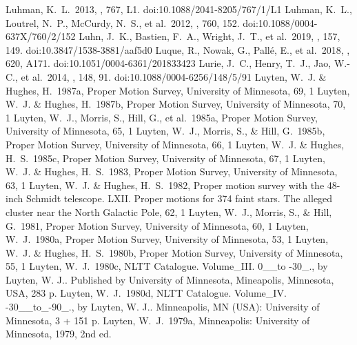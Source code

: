 \documentclass[twocolumn,tighten,twocolappendix]{aastex631}
\begin{document}
\begin{thebibliography}{}
 Luhman, K.~L.\ 2013, \apjl, 767, L1. doi:10.1088/2041-8205/767/1/L1
 Luhman, K.~L., Loutrel, N.~P., McCurdy, N.~S., et al.\ 2012, \apj, 760, 152. doi:10.1088/0004-637X/760/2/152
 Luhn, J.~K., Bastien, F.~A., Wright, J.~T., et al.\ 2019, \aj, 157, 149. doi:10.3847/1538-3881/aaf5d0
 Luque, R., Nowak, G., Pall{\'e}, E., et al.\ 2018, \aap, 620, A171. doi:10.1051/0004-6361/201833423
 Lurie, J.~C., Henry, T.~J., Jao, W.-C., et al.\ 2014, \aj, 148, 91. doi:10.1088/0004-6256/148/5/91
 Luyten, W.~J. \& Hughes, H.\ 1987a, Proper Motion Survey, University of Minnesota, 69, 1
 Luyten, W.~J. \& Hughes, H.\ 1987b, Proper Motion Survey, University of Minnesota, 70, 1
 Luyten, W.~J., Morris, S., Hill, G., et al.\ 1985a, Proper Motion Survey, University of Minnesota, 65, 1
 Luyten, W.~J., Morris, S., \& Hill, G.\ 1985b, Proper Motion Survey, University of Minnesota, 66, 1
 Luyten, W.~J. \& Hughes, H.~S.\ 1985c, Proper Motion Survey, University of Minnesota, 67, 1
 Luyten, W.~J. \& Hughes, H.~S.\ 1983, Proper Motion Survey, University of Minnesota, 63, 1
 Luyten, W.~J. \& Hughes, H.~S.\ 1982, Proper motion survey with the 48-inch Schmidt telescope. LXII. Proper motions for 374 faint stars. The alleged cluster near the North Galactic Pole, 62, 1
 Luyten, W.~J., Morris, S., \& Hill, G.\ 1981, Proper Motion Survey, University of Minnesota, 60, 1
 Luyten, W.~J.\ 1980a, Proper Motion Survey, University of Minnesota, 53, 1
 Luyten, W.~J. \& Hughes, H.~S.\ 1980b, Proper Motion Survey, University of Minnesota, 55, 1
 Luyten, W.~J.\ 1980c, NLTT Catalogue. Volume\_III. 0\_\_to -30\_., by Luyten, W. J..  Published by University of Minnesota, Mineapolis, Minnesota, USA, 283 p.
 Luyten, W.~J.\ 1980d, NLTT Catalogue. Volume\_IV. -30\_\_to\_-90\_., by Luyten, W. J..  Minneapolis, MN (USA): University of Minnesota, 3 + 151 p.
 Luyten, W.~J.\ 1979a, Minneapolis: University of Minnesota, 1979, 2nd ed.

\end{thebibliography}
\end{document}
